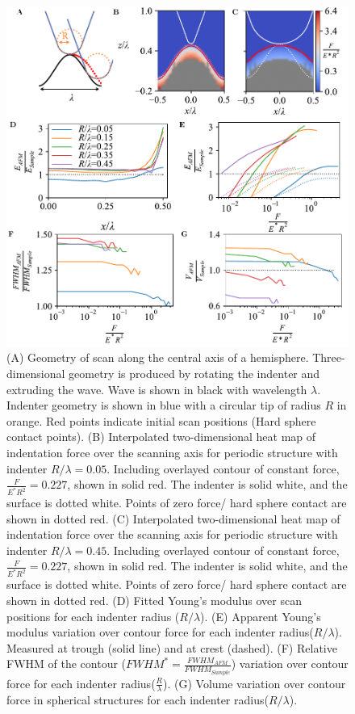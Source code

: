 \begin{figure}[htp]
    \centering
    \includegraphics[width=\linewidth]{Figures/Figure4.pdf} 
    \caption{\label{fig: Wave Compression Plot}(A) Geometry of scan along the central axis of a hemisphere. Three-dimensional geometry is produced by rotating the indenter and extruding the wave. Wave is shown in black with wavelength $\lambda$. Indenter geometry is shown in blue with a circular tip of radius $R$ in orange. Red points indicate initial scan positions (Hard sphere contact points). (B) Interpolated two-dimensional heat map of indentation force over the scanning axis for periodic structure with indenter $R/\lambda=0.05$. Including overlayed contour of constant force, $\frac{F}{E^*R^2} = 0.227 $, shown in solid red. The indenter is solid white, and the surface is dotted white. Points of zero force/ hard sphere contact are shown in dotted red. (C) Interpolated two-dimensional heat map of indentation force over the scanning axis for periodic structure with indenter $R/\lambda=0.45$. Including overlayed contour of constant force, $\frac{F}{E^*R^2} = 0.227 $, shown in solid red. The indenter is solid white, and the surface is dotted white. Points of zero force/ hard sphere contact are shown in dotted red. (D) Fitted Young's modulus over scan positions for each indenter radius ($R/\lambda$). (E) Apparent Young's modulus variation over contour force for each indenter radius($R/\lambda$). Measured at trough (solid line) and at crest (dashed). (F) Relative FWHM of the contour ($FWHM^*=\frac{FWHM_{AFM}}{FWHM_{Sample}}$) variation over contour force for each indenter radius($\frac{R}{\lambda}$). (G)  Volume variation over contour force in spherical structures for each indenter radius($R/\lambda$).}
    
\end{figure}


